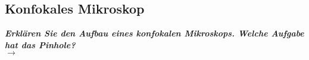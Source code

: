\subsection{\label{subsec:FZV6}Konfokales Mikroskop}
\textbf{\textit{Erklären Sie den Aufbau eines konfokalen Mikroskops. Welche Aufgabe hat das Pinhole?}} \\
$\rightarrow$
